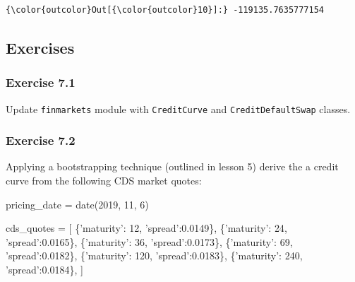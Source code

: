 \documentclass[11pt]{article}
\newenvironment{Shaded}{}{}
\newcommand{\DecValTok}[1]{\textcolor[rgb]{0.25,0.63,0.44}{{#1}}}
\newcommand{\FloatTok}[1]{\textcolor[rgb]{0.25,0.63,0.44}{{#1}}}
\newcommand{\StringTok}[1]{\textcolor[rgb]{0.25,0.44,0.63}{{#1}}}
\newcommand{\NormalTok}[1]{{#1}}
\newcommand{\OperatorTok}[1]{\textcolor[rgb]{0.40,0.40,0.40}{{#1}}}
\begin{document}
\begin{Verbatim}[commandchars=\\\{\}]
{\color{outcolor}Out[{\color{outcolor}10}]:} -119135.7635777154
\end{Verbatim}
            
    \hypertarget{exercises}{%
\subsection{Exercises}\label{exercises}}

\hypertarget{exercise-7.1}{%
  \subsubsection{Exercise 7.1}\label{exercise-7.1}}

Update \verb!finmarkets! module with \verb!CreditCurve! and \verb!CreditDefaultSwap! classes.
    
\hypertarget{exercise-7.2}{%
\subsubsection{Exercise 7.2}\label{exercise-7.2}}

Applying a bootstrapping technique (outlined in lesson 5) derive the a
credit curve from the following CDS market quotes:

\begin{Shaded}
\begin{Highlighting}[]
\NormalTok{pricing_date }\OperatorTok{=}\NormalTok{ date(}\DecValTok{2019}\NormalTok{, }\DecValTok{11}\NormalTok{, }\DecValTok{6}\NormalTok{)}

\NormalTok{cds_quotes }\OperatorTok{=}\NormalTok{ [}
\NormalTok{    \{}\StringTok{'maturity'}\NormalTok{: }\DecValTok{12}\NormalTok{, }\StringTok{'spread'}\NormalTok{:}\FloatTok{0.0149}\NormalTok{\},}
\NormalTok{    \{}\StringTok{'maturity'}\NormalTok{: }\DecValTok{24}\NormalTok{, }\StringTok{'spread'}\NormalTok{:}\FloatTok{0.0165}\NormalTok{\},}
\NormalTok{    \{}\StringTok{'maturity'}\NormalTok{: }\DecValTok{36}\NormalTok{, }\StringTok{'spread'}\NormalTok{:}\FloatTok{0.0173}\NormalTok{\},}
\NormalTok{    \{}\StringTok{'maturity'}\NormalTok{: }\DecValTok{69}\NormalTok{, }\StringTok{'spread'}\NormalTok{:}\FloatTok{0.0182}\NormalTok{\},}
\NormalTok{    \{}\StringTok{'maturity'}\NormalTok{: }\DecValTok{120}\NormalTok{, }\StringTok{'spread'}\NormalTok{:}\FloatTok{0.0183}\NormalTok{\},}
\NormalTok{    \{}\StringTok{'maturity'}\NormalTok{: }\DecValTok{240}\NormalTok{, }\StringTok{'spread'}\NormalTok{:}\FloatTok{0.0184}\NormalTok{\},}
\NormalTok{]}
\end{Highlighting}
\end{Shaded}
\end{document}
